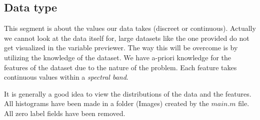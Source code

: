 \documentclass[12pt, a4paper]{article}
\begin{document}
\subsection{Data type}

This segment is about the values our data takes (discreet or continuous). Actually we cannot look at the data itself for, large datasets like the one provided do not get visualized in the variable previewer. The way this will be overcome is by utilizing the knowledge of the dataset. We have a-priori knowledge for the features of the dataset due to the nature of the problem. Each feature takes continuous values within a \textit{spectral band}.
\newline

It is generally a good idea to view the distributions of the data and the features. All histograms have been made in a folder (Images) created by the $main.m$ file. All zero label fields have been removed.
\newline
\end{document}
